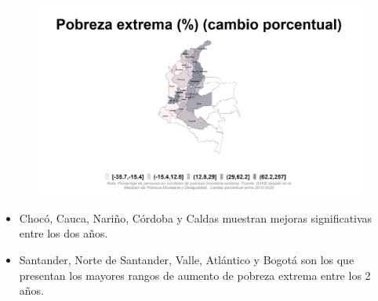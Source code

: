     \begin{figure}[H]
        \caption[Pobreza extrema por departamentos - Cambio porcentual entre 2012 y 2020 ]{\label{pobreza_extrema_dptos_cambio} }
        \begin{center}
        \includegraphics[width=\textwidth,keepaspectratio]{img/var_258_map_change.png}
        \end{center}
    \end{figure}
            \begin{itemize}
                    \item Chocó, Cauca, Nariño, Córdoba y Caldas muestran mejoras significativas entre los dos años.
                    \item Santander, Norte de Santander, Valle, Atlántico y Bogotá son los que presentan los mayores rangos de aumento de pobreza extrema entre los 2 años.
                    \end{itemize}


